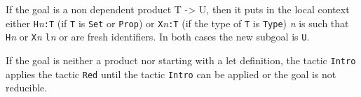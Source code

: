 If the goal is a non dependent product T -> U, then it puts in the
local context either {\tt H}{\it n}{\tt :T} (if {\tt T} is {\tt Set}
or {\tt Prop}) or {\tt X}{\it n}{\tt :T} (if the type of {\tt T} is
{\tt Type}) {\it n} is such that {\tt H}{\it n} or {\tt X}{\it n}
{\tt l}{\it n} or are fresh identifiers.  In both cases the new
subgoal is {\tt U}.

If the goal is neither a product nor starting with a let definition,
the tactic {\tt Intro} applies the tactic {\tt Red} until the tactic
{\tt Intro} can be applied or the goal is not reducible.

\begin{ErrMsgs}
\item {}
\item {}
\end{ErrMsgs}

